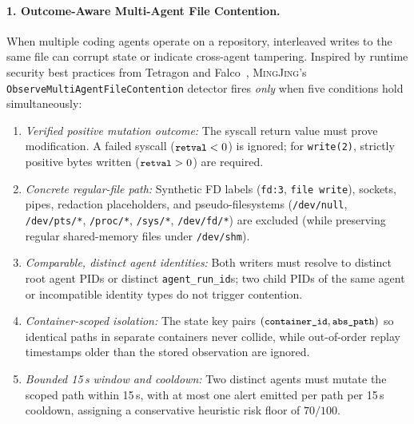 \documentclass[10pt,twocolumn,letterpaper]{article}
\newcommand{\sys}{\textsc{MingJing}}
\newcommand{\code}[1]{\texttt{\small #1}}
\begin{document}
\paragraph{1. Outcome-Aware Multi-Agent File Contention.} When multiple coding agents operate on a repository, interleaved writes to the same file can corrupt state or indicate cross-agent tampering. Inspired by runtime security best practices from Tetragon and Falco~\cite{tetragon,falco}, \sys{}'s \code{ObserveMultiAgentFileContention} detector fires \emph{only} when five conditions hold simultaneously:
\begin{enumerate}
  \item \emph{Verified positive mutation outcome:} The syscall return value must prove modification. A failed syscall ($\code{retval} < 0$) is ignored; for \code{write(2)}, strictly positive bytes written ($\code{retval} > 0$) are required.
  \item \emph{Concrete regular-file path:} Synthetic FD labels (\code{fd:3}, \code{file write}), sockets, pipes, redaction placeholders, and pseudo-filesystems (\code{/dev/null}, \code{/dev/pts/*}, \code{/proc/*}, \code{/sys/*}, \code{/dev/fd/*}) are excluded (while preserving regular shared-memory files under \code{/dev/shm}).
  \item \emph{Comparable, distinct agent identities:} Both writers must resolve to distinct root agent PIDs or distinct \code{agent\_run\_id}s; two child PIDs of the same agent or incompatible identity types do not trigger contention.
  \item \emph{Container-scoped isolation:} The state key pairs $(\code{container\_id}, \code{abs\_path})$ so identical paths in separate containers never collide, while out-of-order replay timestamps older than the stored observation are ignored.
  \item \emph{Bounded 15\,s window and cooldown:} Two distinct agents must mutate the scoped path within 15\,s, with at most one alert emitted per path per 15\,s cooldown, assigning a conservative heuristic risk floor of $70/100$.
\end{enumerate}
\end{document}
